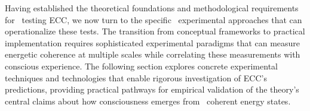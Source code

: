 Having established the theoretical foundations and methodological requirements for~ testing ECC, we now turn to the specific~ experimental approaches that can operationalize these tests. The transition from conceptual frameworks to practical implementation requires sophisticated experimental paradigms that can measure~ energetic coherence at multiple scales while correlating these measurements with~ conscious experience. The following section explores concrete experimental techniques and technologies that enable rigorous investigation of ECC's predictions, providing practical pathways for empirical validation of the theory's central claims about how consciousness emerges from~ coherent energy states.
